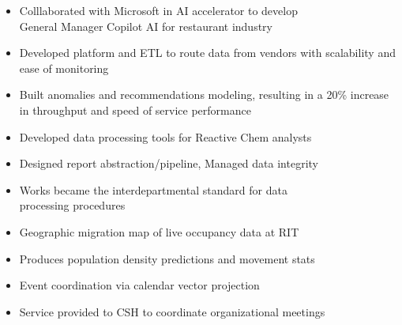 \documentclass[10pt,a4paper,ragged2e,withhyper]{altacv}
\begin{document}
\begin{paracol}{2}


\begin{itemize}
    \item Colllaborated with Microsoft in AI accelerator to develop\\General Manager Copilot AI for restaurant industry
    \item Developed platform and ETL to route data from vendors with scalability and ease of monitoring
    \item Built anomalies and recommendations modeling, resulting in a 20\% increase in throughput and speed of service performance
\end{itemize}

\divider

\begin{itemize}
    \item Developed data processing tools for Reactive Chem analysts
    \item Designed report abstraction/pipeline, Managed data integrity
    \item Works became the interdepartmental standard for data\\processing procedures
\end{itemize}


\begin{itemize}
    \item Geographic migration map of live occupancy data at RIT
    \item Produces population density predictions and movement stats
\end{itemize}

\divider

\begin{itemize}
    \item Event coordination via calendar vector projection
    \item Service provided to CSH to coordinate organizational meetings
\end{itemize}


\end{paracol}
\end{document}
